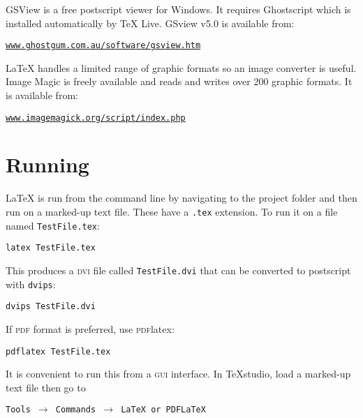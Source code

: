\documentclass[12pt, a4paper]{article}
\begin{document}
GSView is a free postscript viewer for Windows. It requires Ghostscript which is installed automatically by TeX Live. GSview v5.0 is available from: 

\begin{flushleft}
\texttt{\url{www.ghostgum.com.au/software/gsview.htm}}
\end{flushleft}


LaTeX handles a limited range of graphic formats so an image converter is useful. Image Magic is freely available and reads and writes over 200 graphic formats. It is available from: 

\begin{flushleft}
\texttt{\url{www.imagemagick.org/script/index.php}}
\end{flushleft}

\clearpage


\section{Running \LaTeXe}
LaTeX is run from the command line by navigating to the project folder and then run on a marked-up text file. These have a \texttt{.tex} extension. To run it on a file named \texttt{TestFile.tex}: 


\begin{flushleft}
\texttt{latex TestFile.tex}
\end{flushleft}


\begin{flushleft}
This produces a \textsc{dvi} file called \texttt{TestFile.dvi} that can be converted to postscript with \texttt{dvips}: 
\end{flushleft}


\begin{flushleft}
\texttt{dvips TestFile.dvi}
\end{flushleft}


\begin{flushleft}
If \textsc{pdf} format is preferred, use \textsc{pdf}latex:
\end{flushleft}


\begin{flushleft}
\texttt{pdflatex TestFile.tex}
\end{flushleft}


It is convenient to run this from a \textsc{gui} interface. In TeXstudio, load a marked-up text file then go to 


\begin{flushleft}
\texttt{Tools $\rightarrow$ Commands $\rightarrow$ LaTeX or PDFLaTeX}
\end{flushleft}
\end{document}
